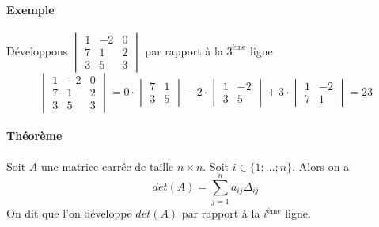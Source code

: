 \paragraph{Exemple} Développons $\begin{vmatrix} 1 & -2 & 0 \\ 7 & 1 & 2 \\ 3 & 5 & 3 \end{vmatrix}$ par rapport à la $3^{\text{ème}}$ ligne
$$\begin{vmatrix} 1 & -2 & 0 \\ 7 & 1 & 2 \\ 3 & 5 & 3 \end{vmatrix} = 
  0 \cdot \begin{vmatrix} 7 & 1 \\ 3 & 5 \end{vmatrix} 
  - 2 \cdot \begin{vmatrix} 1 & -2 \\ 3 & 5 \end{vmatrix} 
  + 3 \cdot \begin{vmatrix} 1 & -2 \\ 7 & 1 \end{vmatrix} 
= 23$$

\paragraph{Théorème} Soit $A$ une matrice carrée de taille $n\times n$. Soit $i \in \{1; \ldots; n\}$. Alors on a
$$det(A) = \sum_{j=1}^{n} a_{ij} \Delta_{ij}$$
On dit que l'on développe $det(A)$ par rapport à la $i^{\text{ème}}$ ligne.

